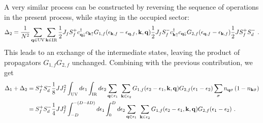 \documentclass[%
reprint,
superscriptaddress,
groupedaddress,
superscriptaddress,
onecolumn,
]{revtex4-2}
\begin{document}
A very similar process can be constructed by reversing the sequence of operations in the present process, while staying in the occupied sector:
\begin{equation}\begin{aligned}
	\Delta_{2} = \frac{1}{N^2}\sum_{{\bf q} \in \text{UV}}\sum_{{\bf k} \in \text{IR}}\frac{1}{2}J_fS_f^+ c^\dagger_{{\bf q}\downarrow}c_{{\bf k}\uparrow}  G_{1,f}(\epsilon_{{\bf k},f} - \epsilon_{{\bf q},f}, {\bf k}, {\bf q}) \frac{1}{2}J_f S_f^- c^\dagger_{{\bf k}\uparrow}c_{{\bf q}\downarrow} G_{2,f}(\epsilon_{{\bf q},f} - \epsilon_{{\bf k},f}) \frac{1}{2}J S_f^+ S_d^- ~.
\end{aligned}\end{equation}
This leads to an exchange of the intermediate states, leaving the product of propagators \(G_{1,f} G_{2,f}\) unchanged. Combining with the previous contribution, we get
\begin{equation}\begin{aligned}
	\Delta_{1}  + \Delta_2 &= S_f^+ S_d^- \frac{1}{8}J J_f^2 \int_\text{UV} d\epsilon_1 \int_\text{IR} d\epsilon_2 \sum_{{\bf q} \in \epsilon_1}~\sum_{{\bf k} \in \epsilon_2}G_{1,f}(\epsilon_2 - \epsilon_1, {\bf k}, {\bf q}) G_{2,f}(\epsilon_1 - \epsilon_2) \sum_\sigma n_{{\bf q}\sigma}\left(1 - n_{{\bf k}\bar\sigma}\right)\\
						   &= S_f^+ S_d^- \frac{1}{4}J J_f^2 \int_{-D}^{-(D - \delta D)} d\epsilon_1 \int_0^D d\epsilon_2 \sum_{{\bf q} \in \epsilon_1}~\sum_{{\bf k} \in \epsilon_2}G_{1,f}(\epsilon_2 - \epsilon_1, {\bf k}, {\bf q}) G_{2,f}(\epsilon_1 - \epsilon_2)~.
\end{aligned}\end{equation}
\end{document}
